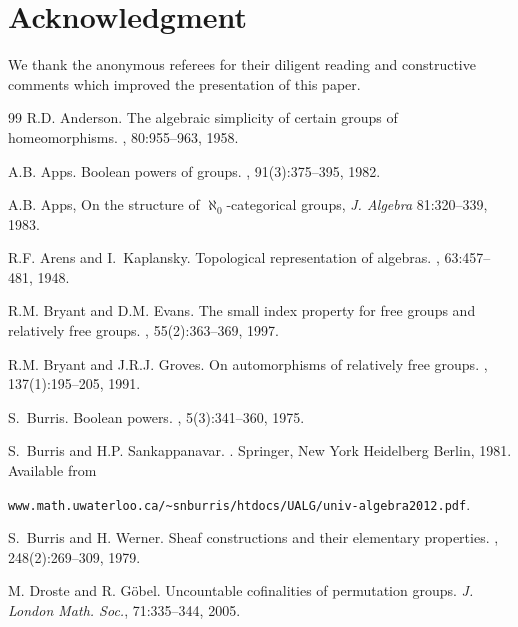 \documentclass[12pt,a4paper,reqno]{amsart}
\numberwithin{equation}{section}
\theoremstyle{plain}
\theoremstyle{definition}
\begin{document}
\section*{Acknowledgment}


We thank the anonymous referees for their diligent reading and constructive comments which improved the presentation of
this paper.



\begin{thebibliography}{99}
R.D. Anderson.
\newblock The algebraic simplicity of certain groups of homeomorphisms.
, 80:955--963, 1958.

A.B. Apps.
\newblock Boolean powers of groups.
, 91(3):375--395, 1982.


A.B. Apps, On the structure of $\aleph _{0}$-categorical groups,
{\it J. Algebra} 81:320--339, 1983.



R.F. Arens and I.~Kaplansky.
\newblock Topological representation of algebras.
, 63:457--481, 1948.

R.M. Bryant and D.M. Evans.
\newblock The small index property for free groups and relatively free groups.
, 55(2):363--369, 1997.

R.M. Bryant and J.R.J. Groves.
\newblock On automorphisms of relatively free groups.
, 137(1):195--205, 1991.

S.~Burris.
\newblock Boolean powers.
, 5(3):341--360, 1975.

S.~Burris and H.P. Sankappanavar.
.
\newblock Springer, New York Heidelberg Berlin, 1981. \newblock Available from

  \verb+www.math.uwaterloo.ca/~snburris/htdocs/UALG/univ-algebra2012.pdf+.

S.~Burris and H. Werner.
\newblock Sheaf constructions and their elementary properties.
, 248(2):269--309, 1979.


  
 M. Droste and R. G\"{o}bel.
 Uncountable cofinalities of permutation groups.
{\em J. London Math. Soc.}, 71:335--344, 2005.


\end{thebibliography}
\end{document}
